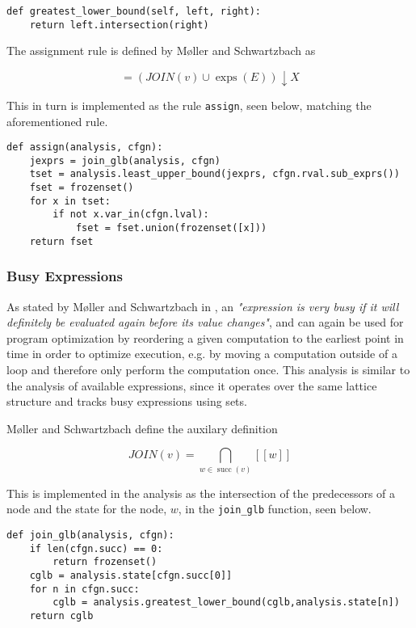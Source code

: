 \begin{verbatim}
def greatest_lower_bound(self, left, right): 
    return left.intersection(right)
\end{verbatim}

\noindent The assignment rule is defined by Møller and Schwartzbach as

\begin{equation}
    [v]=(J O I N(v) \cup \operatorname{exps}(E)) \downarrow X
\end{equation}

\noindent This in turn is implemented as the rule \texttt{assign}, seen below, matching the aforementioned rule. 

\begin{verbatim}
def assign(analysis, cfgn):
    jexprs = join_glb(analysis, cfgn)
    tset = analysis.least_upper_bound(jexprs, cfgn.rval.sub_exprs())
    fset = frozenset()
    for x in tset:
        if not x.var_in(cfgn.lval):
            fset = fset.union(frozenset([x]))
    return fset
\end{verbatim}

\subsubsection{Busy Expressions}
As stated by Møller and Schwartzbach in \cite{spa}, an \textit{"expression is very busy if it will definitely be evaluated again before its value changes"}, and can again be used for program optimization by reordering a given computation to the earliest point in time in order to optimize execution, e.g. by moving a computation outside of a loop and therefore only perform the computation once. This analysis is similar to the analysis of available expressions, since it operates over the same lattice structure and tracks busy expressions using sets.

\newpar Møller and Schwartzbach define the auxilary definition

\begin{equation}
    J O I N (v) = \mathop{\bigcap}_{w \in \operatorname{succ}(v)} [[w]]
\end{equation}

\noindent This is implemented in the analysis as the intersection of the predecessors of a node and the state for the node, $w$, in the \texttt{join\_glb} function, seen below. 

\begin{verbatim}
def join_glb(analysis, cfgn):
    if len(cfgn.succ) == 0:
        return frozenset()
    cglb = analysis.state[cfgn.succ[0]]
    for n in cfgn.succ:
        cglb = analysis.greatest_lower_bound(cglb,analysis.state[n])
    return cglb
\end{verbatim}

